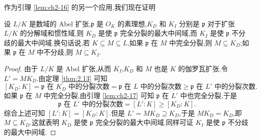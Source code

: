 作为引理 \ref{lem:ch2-16} 的另一个应用,我们现在证明

\begin{lemma}\label{lem:ch2-18}
设 $L/K$ 是数域的 Abel 扩张,$\mathfrak{p}$ 是 $O_K$ 的素理想,$K_D$ 和 $K_I$ 分别是 $\mathfrak{p}$ 对于扩张 $L/K$ 的分解域和惯性域,则 $K_D$ 是使 $\mathfrak{p}$ 完全分裂的最大中间域,而 $K_I$ 是使 $\mathfrak{p}$ 不分歧的最大中间域.换句话说,若 $K\subseteq M\subseteq L$,如果 $\mathfrak{p}$ 在 $M$ 中完全分裂,则 $M\subseteq K_D$;如果 $\mathfrak{p}$ 在 $M$ 中不分歧,则 $M\subseteq K_I$.
\end{lemma}

\begin{proof}
由于 $L/K$ 是 Abel 扩张,从而 $K_I$,$K_D$ 和 $M$ 也是 $K$ 的伽罗瓦扩张.令 $L'=MK_D$.由定理 \ref{thm:2.13} 可知
\[
  [K_D:K]=\mathfrak{p}\text{ 在 }K_D\text{ 中的分裂次数}
  =\mathfrak{p}\text{ 在 }L\text{ 中的分裂次数}
  \geqslant\mathfrak{p}\text{ 在 }L'\text{ 中的分裂次数}.
\]
如果 $\mathfrak{p}$ 在 $M$ 中完全分裂,由引理 \ref{lem:ch2-17} 可知 $\mathfrak{p}$ 在 $L'$ 中也完全分裂,于是
\[
  \mathfrak{p}\text{ 在 }L'\text{ 中的分裂次数}=[L':K]\geqslant[K_D:K].
\]
综合上述可知 $[L':K]=[K_D:K]$.但是 $L'=MK_D\supseteq K_D$,于是 $MK_D=K_D$,即 $M\subseteq K_D$.这就表明 $K_D$ 是使 $\mathfrak{p}$ 完全分裂的最大中间域.同样可证 $K_I$ 是使 $\mathfrak{p}$ 不分歧的最大中间域.
\end{proof}

